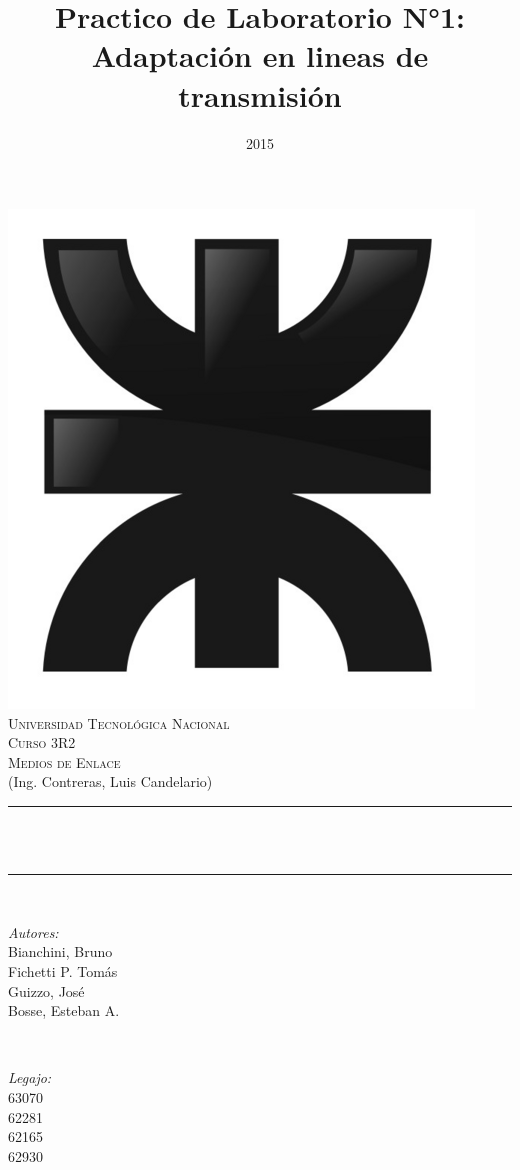 \documentclass[12pt]{article}
\title{Practico de Laboratorio N°1: Adaptación en lineas de transmisión }								%
\author{}								%
\date{2015}											%
\makeatletter
\let\thetitle\@title
\makeatother
\begin{document}

\begin{titlepage}
	\centering
    \vspace*{0.5 cm}
     \includegraphics[scale = 0.8]{Logo_UTN.png}\\[1.0 cm]	%
    \textsc{\LARGE Universidad Tecnológica Nacional}\\[2.0 cm]	%
	\textsc{\Large Curso 3R2}\\[0.5 cm]				%
	\textsc{\large Medios de Enlace}\\[0 cm]				%
	\textrm{\large (Ing. Contreras, Luis Candelario)}\\[0.5 cm]
    \rule{\linewidth}{0.2 mm} \\[0.4 cm]
	{ \huge \bfseries \thetitle}\\
	\rule{\linewidth}{0.2 mm} \\[1 cm]
	
	\begin{minipage}{0.4\textwidth}
		\begin{flushleft} \large
			\emph{Autores:}\\
			Bianchini, Bruno\\Fichetti P. Tomás\\Guizzo, José\\Bosse, Esteban A.
			\end{flushleft}
			\end{minipage}~
			\begin{minipage}{0.4\textwidth}
			\begin{flushright} \large
			\emph{Legajo:} \\
			 63070\\62281\\62165\\62930									%
		\end{flushright}
	\end{minipage}\\[2 cm]
	

\end{titlepage}
\end{document}
